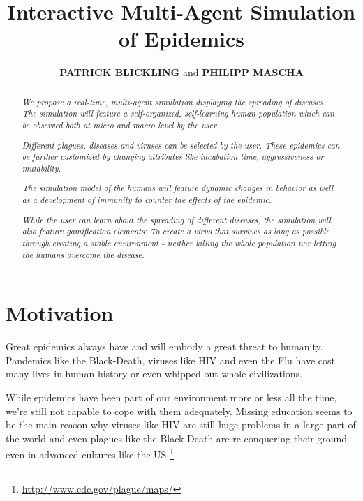 \documentclass{acmtog} %
\begin{document}

\title{Interactive Multi-Agent Simulation of Epidemics} %

\author{\textbf{\uppercase{Patrick Blickling}} {\upshape and}
\textbf{\uppercase{Philipp Mascha}}
}




\maketitle

\begin{abstract}
\textit{
We propose a real-time, multi-agent simulation displaying the spreading of diseases. The simulation will feature a self-organized, self-learning human population which can be observed both at micro and macro level by the user. 
}

\textit{
Different plagues, diseases and viruses can be selected by the user. These epidemics can be further customized by changing attributes like incubation time, aggressiveness or mutability.
}

\textit{
The simulation model of the humans will feature dynamic changes in behavior as well as a development of immunity to counter the effects of the epidemic.
}

\textit{
While the user can learn about the spreading of different diseases, the simulation will also feature gamification elements: To create a virus that survives as long as possible through creating a stable environment - neither killing the whole population nor letting the humans overcome the disease.
}
\end{abstract}

\section{Motivation}

Great epidemics always have and will embody a great threat to humanity. Pandemics like the Black-Death, viruses like HIV and even the Flu have cost many lives in human history or even whipped out whole civilizations.

While epidemics have been part of our environment more or less all the time, we're still not capable to cope with them adequately. Missing education seems to be the main reason why viruses like HIV are still huge problems in a large part of the world and even plagues like the Black-Death are re-conquering their ground - even in advanced cultures like the US \footnote{\url{http://www.cdc.gov/plague/maps/}}.
\end{document}
